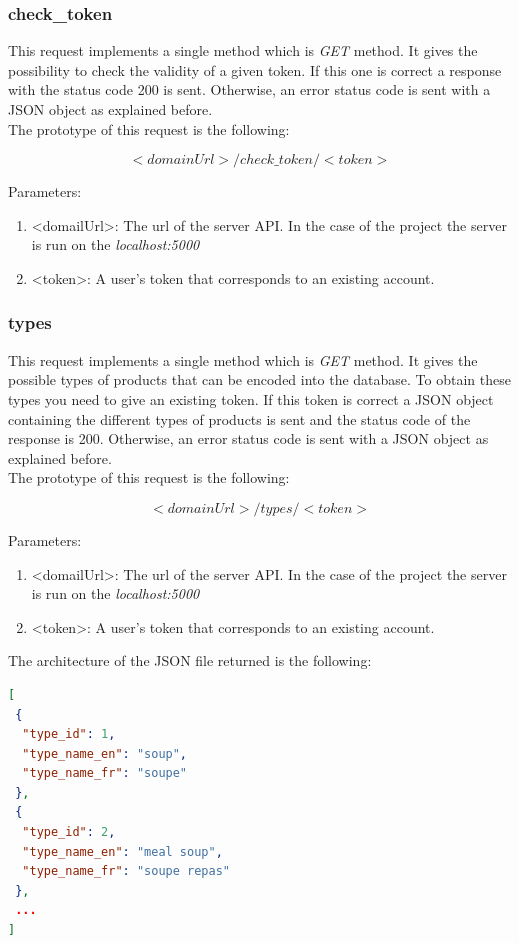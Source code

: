 \subsubsection{check\_token}
This request implements a single method which is \textit{GET} method. It gives the possibility to check the validity of a given token. If this one is correct a response with the status code 200 is sent. Otherwise, an error status code is sent with a JSON object as explained before.\\

The prototype of this request is the following:

$$<domainUrl>/check\_token/<token>$$

Parameters:
\begin{enumerate}
\item <domailUrl>: The url of the server API. In the case of the project the server is run on the \textit{localhost:5000}
\item <token>: A user's token that corresponds to an existing account.
\end{enumerate}

\subsubsection{types}
This request implements a single method which is \textit{GET} method. It gives the possible types of products that can be encoded into the database. To obtain these types you need to give an existing token. If this token is correct a JSON object containing the different types of products is sent and the status code of the response is 200. Otherwise, an error status code is sent with a JSON object as explained before.\\

The prototype of this request is the following:

$$<domainUrl>/types/<token>$$

Parameters:
\begin{enumerate}
\item <domailUrl>: The url of the server API. In the case of the project the server is run on the \textit{localhost:5000}
\item <token>: A user's token that corresponds to an existing account.
\end{enumerate}

The architecture of the JSON file returned is the following:
\begin{lstlisting}[language=json]
[
 {
  "type_id": 1,
  "type_name_en": "soup",
  "type_name_fr": "soupe"
 },
 {
  "type_id": 2,
  "type_name_en": "meal soup",
  "type_name_fr": "soupe repas"
 },
 ...
]
\end{lstlisting}

